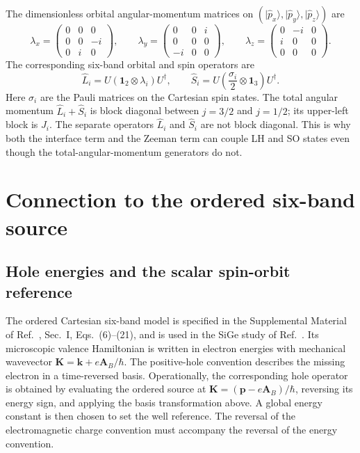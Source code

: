 \documentclass[10pt,letterpaper]{article}
\newcommand{\ket}[1]{\lvert #1\rangle}
\newcommand{\one}{\mathbf 1}
\begin{document}
The dimensionless orbital angular-momentum matrices on $(\ket{ \hat{p}_ x},\ket{ \hat{p}_ y},\ket{ \hat{p}_ z})$ are
\begin{equation}
\lambda_x=\begin{pmatrix}0&0&0\\0&0&-i\\0&i&0\end{pmatrix},\qquad
\lambda_y=\begin{pmatrix}0&0&i\\0&0&0\\-i&0&0\end{pmatrix},\qquad
\lambda_z=\begin{pmatrix}0&-i&0\\i&0&0\\0&0&0\end{pmatrix}.
\label{eq:lambda}
\end{equation}
The corresponding six-band orbital and spin operators are
\begin{equation}
\hat L_i=U(\one_2\otimes\lambda_i)U^\dagger,
\qquad
\hat S_i=U\left(\frac{\sigma_i}{2}\otimes\one_3\right)U^\dagger.
\label{eq:LS}
\end{equation}
Here $\sigma_i$ are the Pauli matrices on the Cartesian spin states. The total angular momentum $\hat L_i+\hat S_i$ is block diagonal between $j=3/2$ and $j=1/2$; its upper-left block is $J_i$. The separate operators $\hat L_i$ and $\hat S_i$ are not block diagonal. This is why both the interface term and the Zeeman term can couple LH and SO states even though the total-angular-momentum generators do not.

\section{Connection to the ordered six-band source}
\label{app:source}

\subsection{Hole energies and the scalar spin-orbit reference}

The ordered Cartesian six-band model is specified in the Supplemental Material of Ref.~\cite{delvecchio2026}, Sec.~I, Eqs.~(6)--(21), and is used in the SiGe study of Ref.~\cite{valvo}. Its microscopic valence Hamiltonian is written in electron energies with mechanical wavevector $\bm K=\bm k+e\bm A_B/\hbar$. The positive-hole convention describes the missing electron in a time-reversed basis. Operationally, the corresponding hole operator is obtained by evaluating the ordered source at $\bm K=(\bm p-e\bm A_B)/\hbar$, reversing its energy sign, and applying the basis transformation above. A global energy constant is then chosen to set the well reference. The reversal of the electromagnetic charge convention must accompany the reversal of the energy convention.
\end{document}
